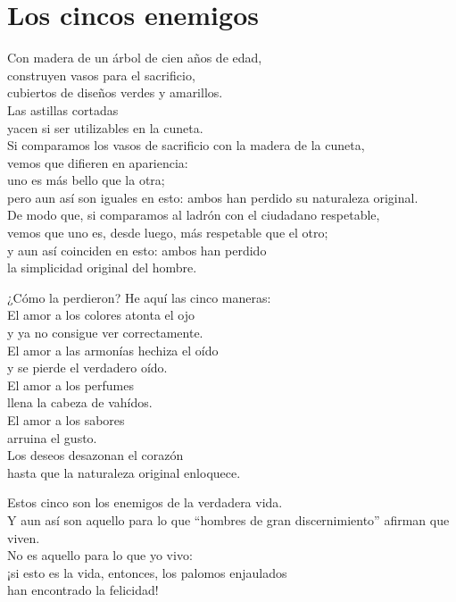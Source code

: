 \documentclass[book,b5paper,hidelinks,final]{memoir}
\begin{document}
	\chapter*{Los cincos enemigos}
	
	Con madera de un árbol de cien años de edad,\\
	construyen vasos para el sacrificio,\\
	cubiertos de diseños verdes y amarillos.\\
	Las astillas cortadas\\
	yacen si ser utilizables en la cuneta.\\
	Si comparamos los vasos de sacrificio con la madera de la cuneta,\\
	vemos que difieren en apariencia:\\
	uno es más bello que la otra;\\
	pero aun así son iguales en esto: ambos han perdido su naturaleza
	original.\\
	De modo que, si comparamos al ladrón con el ciudadano respetable,\\
	vemos que uno es, desde luego, más respetable que el otro;\\
	y aun así coinciden en esto: ambos han perdido\\
	la simplicidad original del hombre.
	
	¿Cómo la perdieron? He aquí las cinco maneras:\\
	El amor a los colores atonta el ojo\\
	y ya no consigue ver correctamente.\\
	El amor a las armonías hechiza el oído\\
	y se pierde el verdadero oído.\\
	El amor a los perfumes\\
	llena la cabeza de vahídos.\\
	El amor a los sabores\\
	arruina el gusto.\\
	Los deseos desazonan el corazón\\
	hasta que la naturaleza original enloquece.
	
	Estos cinco son los enemigos de la verdadera vida.\\
	Y aun así son aquello para lo que ``hombres de gran discernimiento''
	afirman que viven.\\
	No es aquello para lo que yo vivo:\\
	¡si esto es la vida, entonces, los palomos enjaulados\\
	han encontrado la felicidad!
	
\end{document}
